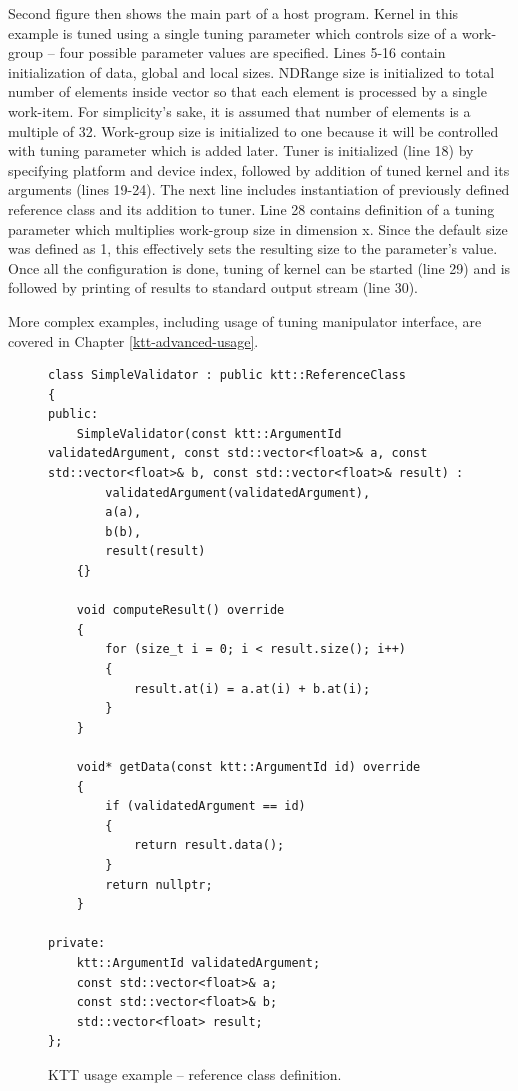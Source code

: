 \documentclass
[
    digital, %
    oneside, %
    table, %
    nolof, %
    nolot, %
    nocover %
]{fithesis3}
\begin{document}
Second figure then shows the main part of a host program. Kernel in this example is tuned using a single tuning parameter which controls size of a
work-group -- four possible parameter values are specified. Lines 5-16 contain initialization of data, global and local sizes. NDRange size is
initialized to total number of elements inside vector so that each element is processed by a single work-item. For simplicity's sake, it is assumed that
number of elements is a multiple of 32. Work-group size is initialized to one because it will be controlled with tuning parameter which is added later.
Tuner is initialized (line 18) by specifying platform and device index, followed by addition of tuned kernel and its arguments (lines 19-24). The next
line includes instantiation of previously defined reference class and its addition to tuner. Line 28 contains definition of a tuning parameter which
multiplies work-group size in dimension x. Since the default size was defined as 1, this effectively sets the resulting size to the parameter's value.
Once all the configuration is done, tuning of kernel can be started (line 29) and is followed by printing of results to standard output stream (line 30).

More complex examples, including usage of tuning manipulator interface, are covered in Chapter \ref{ktt-advanced-usage}.

\begin{figure}
\footnotesize
\begin{adjustwidth}{-1cm}{-1cm}
\begin{lstlisting}
class SimpleValidator : public ktt::ReferenceClass
{
public:
    SimpleValidator(const ktt::ArgumentId validatedArgument, const std::vector<float>& a, const std::vector<float>& b, const std::vector<float>& result) :
        validatedArgument(validatedArgument),
        a(a),
        b(b),
        result(result)
    {}
    
    void computeResult() override
    {
        for (size_t i = 0; i < result.size(); i++)
        {
            result.at(i) = a.at(i) + b.at(i);
        }
    }
    
    void* getData(const ktt::ArgumentId id) override
    {
        if (validatedArgument == id)
        {
            return result.data();
        }
        return nullptr;
    }
    
private:
    ktt::ArgumentId validatedArgument;
    const std::vector<float>& a;
    const std::vector<float>& b;
    std::vector<float> result;
};
\end{lstlisting}
\caption{KTT usage example -- reference class definition.}
\label{ktt-api-usage-reference}
\end{adjustwidth}
\end{figure}
\end{document}
